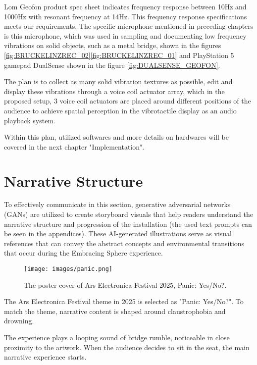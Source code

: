             Lom Geofon product spec sheet indicates frequency response between 10Hz and 1000Hz with resonant frequency at 14Hz. This frequency response specifications meets our requirements. The specific microphone mentioned in preceding chapters is this microphone, which was used in sampling and documenting low frequency vibrations on solid objects, such as a metal bridge, shown in the figures \ref{fig:BRUCKELINZREC_02}\ref{fig:BRUCKELINZREC_01} and PlayStation 5 gamepad DualSense shown in the figure \ref{fig:DUALSENSE_GEOFON}.\par

            The plan is to collect as many solid vibration textures as possible, edit and display these vibrations through a voice coil actuator array, which in the proposed setup, 3 voice coil actuators are placed around different positions of the audience to achieve spatial perception in the vibrotactile display as an audio playback system.\par

            Within this plan, utilized softwares and more details on hardwares will be covered in the next chapter "Implementation".\par
    \section{Narrative Structure}
        To effectively communicate in this section, generative adversarial networks (GANs) are utilized to create storyboard visuals that help readers understand the narrative structure and progression of the installation (the used text prompts can be seen in the appendices). These AI-generated illustrations serve as visual references that can convey the abstract concepts and environmental transitions that occur during the Embracing Sphere experience.\par

        \begin{figure}[H]
            \centering
            \texttt{[image: images/panic.png]}
            \caption{The poster cover of Ars Electronica Festival 2025, Panic: Yes/No?.}
            \label{fig:PANIC}
        \end{figure}

        The Ars Electronica Festival theme in 2025 is selected as "Panic: Yes/No?". To match the theme, narrative content is shaped around claustrophobia and drowning.\par

        The experience plays a looping sound of bridge rumble, noticeable in close proximity to the artwork. When the audience decides to sit in the seat, the main narrative experience starts.\par

